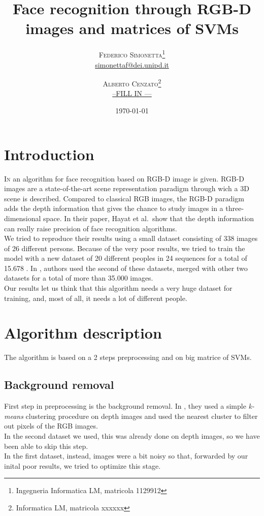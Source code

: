 \documentclass[twoside,twocolumn]{article}
\title{Face recognition through RGB-D images and matrices of SVMs} %
\author{%
	\textsc{Federico Simonetta}\thanks{Ingegneria Informatica LM, matricola 1129912} \\[1ex] %
	\normalsize \href{mailto:simonettaf@dei.unipd.it}{simonettaf@dei.unipd.it} %
	\and %
	\textsc{Alberto Cenzato}\thanks{Informatica LM, matricola xxxxxx} \\[1ex] %
	\normalsize \href{mailto:john@smith.com}{--FILL IN ---} %
}
\date{\today} %
\begin{document}
\Huge
\bfseries
\maketitle
\mdseries
\normalsize

\section{Introduction}

\lettrine[nindent=0em,lines=3]{I}n \citep{Hayat2016} an algorithm for face
recognition based on RGB-D image is given. RGB-D images are a state-of-the-art
scene representation paradigm through wich a 3D scene is described. Compared to
classical RGB images, the RGB-D paradigm adds the depth information that gives
the chance to study images in a three-dimensional space. In their paper, Hayat
et al.\ show that the depth information can really raise precision of face
recognition algorithms.
\\
We tried to reproduce their results using a small dataset consisting of 338
images of 26 different persons. Because of the very poor results, we tried to
train the model with a new dataset of 20 different peoples in 24 sequences for
a total of 15.678 \citep{Fanelli2013}. In \citep{Hayat2016}, authors used the
second of these datasets, merged with other two datasets for a total of more
than 35.000 images.  \\ Our results let us think that this algorithm needs a
very huge dataset for training, and, most of all, it needs a lot of different
people.

\section{Algorithm description}
The algorithm is based on a 2 steps preprocessing and on big matrice of SVMs.

\subsection{Background removal}
First step in preprocessing is the background removal. In \cite{Hayat2016},
they used a simple \textit{k-means} clustering procedure on depth images and
used the nearest cluster to filter out pixels of the RGB images.
\\
In the second dataset we used, this was already done on depth images, so we
have been able to skip this step.
\\
In the first dataset, instead, images were a bit noisy so that, forwarded by
our inital poor results, we tried to optimize this stage.
\end{document}
